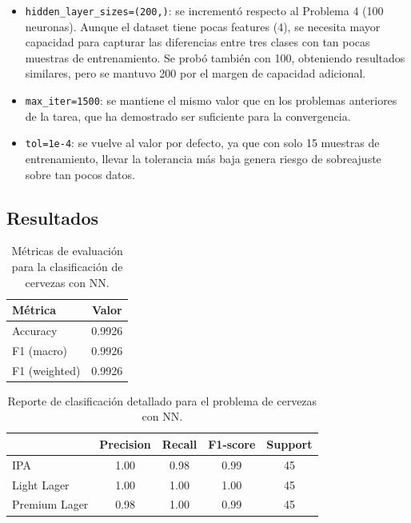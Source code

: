 \documentclass{article}
\begin{document}
\begin{itemize}
    \item \texttt{hidden\_layer\_sizes=(200,)}: se incrementó respecto al Problema 4 (100 neuronas). Aunque el dataset tiene pocas features (4), se necesita mayor capacidad para capturar las diferencias entre tres clases con tan pocas muestras de entrenamiento. Se probó también con 100, obteniendo resultados similares, pero se mantuvo 200 por el margen de capacidad adicional.
    \item \texttt{max\_iter=1500}: se mantiene el mismo valor que en los problemas anteriores de la tarea, que ha demostrado ser suficiente para la convergencia.
    \item \texttt{tol=1e-4}: se vuelve al valor por defecto, ya que con solo 15 muestras de entrenamiento, llevar la tolerancia más baja genera riesgo de sobreajuste sobre tan pocos datos.
\end{itemize}

\subsection{Resultados}

\begin{table}[H]
\centering
\begin{tabular}{lc}
\hline
\textbf{Métrica} & \textbf{Valor} \\
\hline
Accuracy         & 0.9926 \\
F1 (macro)       & 0.9926 \\
F1 (weighted)    & 0.9926 \\
\hline
\end{tabular}
\caption{Métricas de evaluación para la clasificación de cervezas con NN.}
\label{tab:p5_resultados}
\end{table}

\begin{table}[H]
\centering
\begin{tabular}{lcccc}
\hline
& \textbf{Precision} & \textbf{Recall} & \textbf{F1-score} & \textbf{Support} \\
\hline
IPA           & 1.00 & 0.98 & 0.99 & 45 \\
Light Lager   & 1.00 & 1.00 & 1.00 & 45 \\
Premium Lager & 0.98 & 1.00 & 0.99 & 45 \\
\hline
\end{tabular}
\caption{Reporte de clasificación detallado para el problema de cervezas con NN.}
\label{tab:p5_report}
\end{table}
\end{document}
